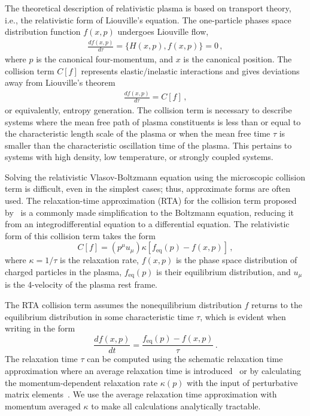 The theoretical description of relativistic plasma is based on transport theory, i.e., the relativistic form of Liouville's equation. The one-particle phases space distribution function $f(x,p)$ undergoes Liouville flow,
\begin{align}
    \frac{d f(x,p)}{d\tau} = \{H(x,p), f(x,p)\} = 0\,,
\end{align}
where $p$ is the canonical four-momentum, and $x$ is the canonical position. The collision term $C[f]$ represents elastic/inelastic interactions and gives deviations away from Liouville's theorem
\begin{align}\label{eq:LpC}
    \frac{d f(x,p)}{d\tau} = C[f]\,,
\end{align}
or equivalently, entropy generation. The collision term is necessary to describe systems where the mean free path of plasma constituents is less than or equal to the characteristic length scale of the plasma or when the mean free time $\tau$ is smaller than the characteristic oscillation time of the plasma. This pertains to systems with high density, low temperature, or strongly coupled systems.

Solving the relativistic Vlasov-Boltzmann equation using the microscopic collision term  is difficult, even in the simplest cases; thus, approximate forms are often used. The relaxation-time approximation (RTA) for the collision term proposed by~\cite{Anderson:1974nyl} is a commonly made simplification to the Boltzmann equation, reducing it from an integrodifferential equation to a differential equation. The relativistic form of this collision term takes the form
\begin{equation}\label{eq:lincoll}
C[f] = (p^\mu u_\mu) \kappa [ f_\mathrm{eq}(p) - f(x,p) ] \,,
\end{equation}
where $\kappa=1/\tau$ is the relaxation rate, $f(x,p)$ is the phase space distribution of charged particles in the plasma, $f_\mathrm{eq}(p)$ is their equilibrium distribution, and $u_\mu$ is the 4-velocity of the plasma rest frame.

The RTA collision term assumes the nonequilibrium distribution $f$ returns to the equilibrium distribution in some characteristic time $\tau$, which is evident when writing  in the form
\begin{equation}
    \frac{d f(x,p)}{dt} = \frac{f_\mathrm{eq}(p) - f(x,p) }{\tau}\,.
\end{equation}
The relaxation time $\tau$ can be computed using the schematic relaxation time approximation where an average relaxation time is introduced~\cite{Mrowczynski:1988xu,Satow:2014lia} or by calculating the momentum-dependent relaxation rate $\kappa(p)$ with the input of perturbative matrix elements~\cite{Ahonen:1996nq}. We use the average relaxation time approximation with momentum averaged $\kappa$ to make all calculations analytically tractable.

